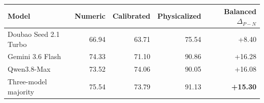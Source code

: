 \begin{tabular}{lrrrr}
\toprule
Model & Numeric & Calibrated & Physicalized & Balanced $\Delta_{P-N}$ \\
\midrule
Doubao Seed 2.1 Turbo & 66.94 & 63.71 & 75.54 & +8.40 \\
Gemini 3.6 Flash & 74.33 & 71.10 & 90.86 & +16.28 \\
Qwen3.8-Max & 73.52 & 74.06 & 90.05 & +16.08 \\
\midrule
Three-model majority & 75.54 & 73.79 & 91.13 & \textbf{+15.30} \\
\bottomrule
\end{tabular}
